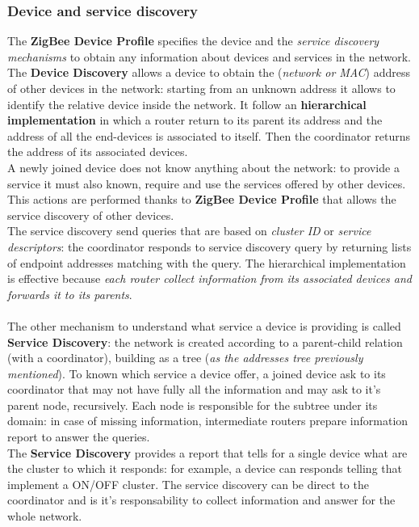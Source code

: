 \documentclass[10pt,a4paper]{report}
\theoremstyle{definition}
\begin{document}
\subsubsection{Device and service discovery}\label{sec:device-and-service-discovery}
The \textbf{ZigBee Device Profile} specifies the device and the \textit{service discovery mechanisms} to obtain any information about devices and services in the network. The \textbf{Device Discovery} allows a device to obtain the (\textit{network or MAC}) address of other devices in the network: starting from an unknown address it allows to identify the relative device inside the network. It follow an \textbf{hierarchical implementation} in which a router return to its parent its address and the address of all the end-devices is associated to itself. Then the coordinator returns the address of its associated devices.\\
A newly joined device does not know anything about the network: to provide a service it must also known, require and use the services offered  by other devices. This actions are performed thanks to \textbf{ZigBee Device Profile} that allows the service discovery of other devices.\\
The service discovery send queries that are based on \textit{cluster ID} or \textit{service descriptors}: the coordinator responds to service discovery query by returning lists of endpoint addresses matching with the query. The hierarchical implementation is effective because \textit{each router collect information from its associated devices and forwards it to its parents}.\\\\
The other mechanism to understand what service a device is providing is called \textbf{Service Discovery}: the network is created according to a parent-child relation (with a coordinator), building as a tree (\textit{as the addresses tree previously mentioned}). To known which service a device offer, a joined device ask to its coordinator that may not have fully all the information and may ask to it's parent node, recursively. Each node is responsible for the subtree under its domain: in case of missing information, intermediate routers prepare information report to answer the queries.\\
The \textbf{Service Discovery} provides a report that tells for a single device what are the cluster to which it responds: for example, a device can responds telling that implement a ON/OFF cluster. The service discovery can be direct to the coordinator and is it's responsability to collect information and answer for the whole network.
\end{document}
